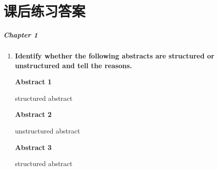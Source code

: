 \documentclass[a4paper]{ctexbook}
\begin{document}
\restoregeometry

\chapter*{课后练习答案}

\paragraph*{Chapter 1}\par
\begin{enumerate}
  \item \textbf{Identify whether the following abstracts are structured or unstructured and tell the reasons.}
  
  \textbf{Abstract 1}
  
  \hspace*{2em}structured abstract 
  
  \textbf{Abstract 2}

  \hspace*{2em}unstructured abstract 
  
  \textbf{Abstract 3}

  \hspace*{2em}structured abstract
\end{enumerate}
\end{document}

